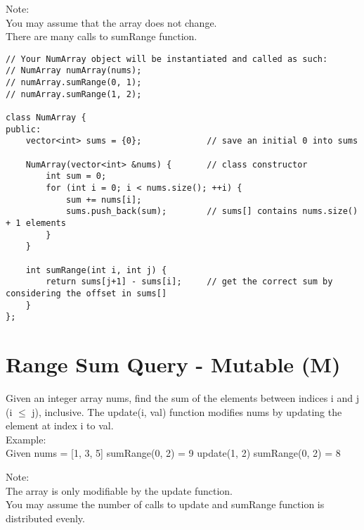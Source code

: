 Note:\\
    You may assume that the array does not change.\\
    There are many calls to sumRange function.\\

\begin{lstlisting}
// Your NumArray object will be instantiated and called as such:
// NumArray numArray(nums);
// numArray.sumRange(0, 1);
// numArray.sumRange(1, 2);

class NumArray {
public:
    vector<int> sums = {0};             // save an initial 0 into sums
    
    NumArray(vector<int> &nums) {       // class constructor
        int sum = 0;
        for (int i = 0; i < nums.size(); ++i) {
            sum += nums[i];
            sums.push_back(sum);        // sums[] contains nums.size() + 1 elements
        }
    }
    
    int sumRange(int i, int j) {
        return sums[j+1] - sums[i];     // get the correct sum by considering the offset in sums[]
    }
};
\end{lstlisting}


\section{Range Sum Query - Mutable (M)}
Given an integer array nums, find the sum of the elements between indices i and j (i $\leq$ j), inclusive. The update(i, val) function modifies nums by updating the element at index i to val. \\

Example: \\
Given nums = [1, 3, 5]
sumRange(0, 2) = 9
update(1, 2)
sumRange(0, 2) = 8

Note:\\
    The array is only modifiable by the update function.\\
    You may assume the number of calls to update and sumRange function is distributed evenly.\\

